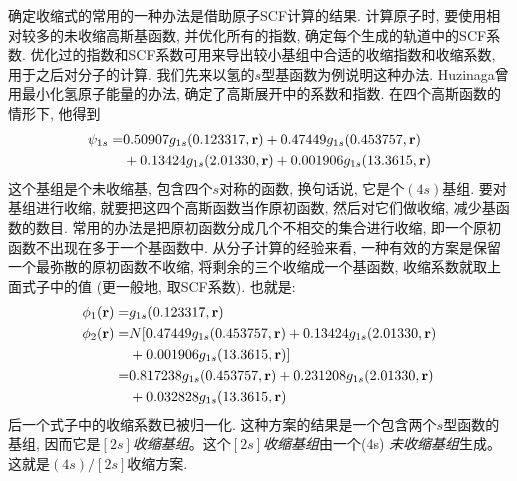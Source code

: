 确定收缩式的常用的一种办法是借助原子SCF计算的结果. 
计算原子时, 
要使用相对较多的未收缩高斯基函数, 
并优化所有的指数, 
确定每个生成的轨道中的SCF系数. 
优化过的指数和SCF系数可用来导出较小基组中合适的收缩指数和收缩系数, 
用于之后对分子的计算. 
我们先来以氢的$s$型基函数为例说明这种办法. 
Huzinaga曾用最小化氢原子能量的办法, 
确定了高斯展开中的系数和指数. 
在四个高斯函数的情形下, 
他得到
\begin{align}
	\psi_{1s} = &   0.50907g_{1s}(0.123317,\mathbf{r}) + 0.47449 g_{1s}(0.453757,\mathbf{r}) \notag\\
	& + 0.13424 g_{1s}(2.01330,\mathbf{r}) + 0.001906 g_{1s}(13.3615,\mathbf{r})
\end{align}
这个基组是个未收缩基, 
包含四个$s$对称的函数, 
换句话说, 
它是个$(4s)$基组. 
要对基组进行收缩, 
就要把这四个高斯函数当作原初函数, 
然后对它们做收缩, 
减少基函数的数目. 
常用的办法是把原初函数分成几个不相交的集合进行收缩, 
即一个原初函数不出现在多于一个基函数中. 
从分子计算的经验来看, 
一种有效的方案是保留一个最弥散的原初函数不收缩, 
将剩余的三个收缩成一个基函数, 
收缩系数就取上面式子中的值 (更一般地, 
取SCF系数). 
也就是:
\begin{align}
	\phi_1(\mathbf{r}) = & g_{1s}(0.123317,\mathbf{r})                                               \\
	\phi_2(\mathbf{r}) = & N[0.47449g_{1s}(0.453757,\mathbf{r})+ 0.13424 g_{1s}(2.01330,\mathbf{r}) \notag \\
	& + 0.001906 g_{1s}(13.3615,\mathbf{r})]                                    \notag \\
	=              & 0.817238g_{1s}(0.453757,\mathbf{r})+ 0.231208 g_{1s}(2.01330,\mathbf{r})  \notag\\
	& +0.032828 g_{1s}(13.3615,\mathbf{r})
\end{align}
后一个式子中的收缩系数已被归一化. 
这种方案的结果是一个包含两个$s$型函数的基组, 
因而它是\emph{$[2s]$收缩基组}。这个\emph{$[2s]$收缩基组}由一个(4s) \emph{未收缩基组}生成。 
这就是$(4s)/[2s]$收缩方案.


